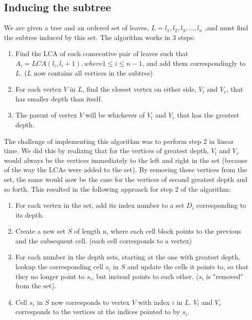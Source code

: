 \subsection{Inducing the subtree}
We are given a tree and an ordered set of leaves, $L=l_1,l_2,l_3,...,l_n$ ,and must find the subtree induced by this set. The algorithm works in 3 steps:
\begin{enumerate}
	\item Find the LCA of each consecutive pair of leaves such that $A_i=LCA(l_i,l_i+1), where 1 \le i \le n-1$, and add them correspondingly to $L$. ($L$ now contains all vertices in the subtree)
	\item For each vertex $V$ in $L$, find the closest vertex on either side, $V_l$ and $V_r$, that has smaller depth than itself.
	\item The parent of vertex $V$ will be whichever of $V_l$ and $V_r$ that has the greatest depth.
\end{enumerate}

The challenge of implementing this algorithm was to perform step 2 in linear time. We did this by realizing that for the vertices of greatest depth, $V_l$ and $V_r$ would always be the vertices immediately to the left and right in the set (because of the way the LCAs were added to the set). By removing these vertices from the set, the same would now be the case for the vertices of second greatest depth and so forth. This resulted in the following approach for step 2 of the algorithm:
\begin{enumerate}
	\item For each vertex in the set, add its index number to a set $D_i$ corresponding to its depth.
	\item Create a new set $S$ of length n, where each cell block points to the previous and the subsequent cell. (each cell corresponds to a vertex)
	\item For each number in the depth sets, starting at the one with greatest depth, lookup the corresponding cell $s_i$ in $S$ and update the cells it points to, so that they no longer point to $s_i$, but instead points to each other. ($s_i$ is "removed" from the set).
	\item Cell $s_i$ in $S$ now corresponds to vertex $V$ with index $i$ in $L$. $V_l$ and $V_r$ corresponds to the vertices at the indices pointed to by $s_i$.
\end{enumerate}

